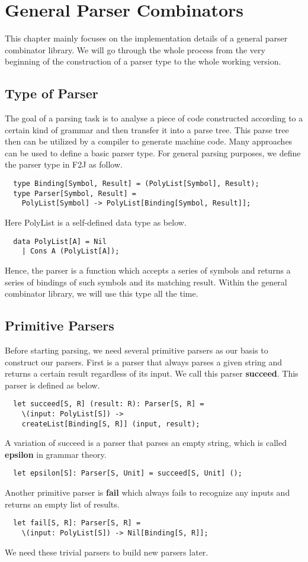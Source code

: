 \chapter{General Parser Combinators}
This chapter mainly focuses on the implementation details of a general parser combinator library. We will go through the whole process from the very beginning of the construction of a parser type to the whole working version.

\section{Type of Parser}
The goal of a parsing task is to analyse a piece of code constructed according to a certain kind of grammar and then transfer it into a parse tree. This parse tree then can be utilized by a compiler to generate machine code. Many approaches can be used to define a basic parser type. For general parsing purposes, we define the parser type in F2J as follow.
\begin{lstlisting}
  type Binding[Symbol, Result] = (PolyList[Symbol], Result);
  type Parser[Symbol, Result] = 
	PolyList[Symbol] -> PolyList[Binding[Symbol, Result]];
\end{lstlisting}
Here PolyList is a self-defined data type as below.
\begin{lstlisting}
  data PolyList[A] = Nil
	| Cons A (PolyList[A]);
\end{lstlisting}
Hence, the parser is a function which accepts a series of symbols and returns a series of bindings of such symbols and its matching result. Within the general combinator library, we will use this type all the time.

\section{Primitive Parsers}
Before starting parsing, we need several primitive parsers as our basis to construct our parsers. First is a parser that always parses a given string and returns a certain result regardless of its input. We call this parser \textbf{succeed}. This parser is defined as below.
\begin{lstlisting}
  let succeed[S, R] (result: R): Parser[S, R] =
	\(input: PolyList[S]) -> 
	createList[Binding[S, R]] (input, result);
\end{lstlisting}
A variation of succeed is a parser that parses an empty string, which is called \textbf{epsilon} in grammar theory.
\begin{lstlisting}
  let epsilon[S]: Parser[S, Unit] = succeed[S, Unit] ();
\end{lstlisting}
Another primitive parser is \textbf{fail} which always fails to recognize any inputs and returns an empty list of results.
\begin{lstlisting}
  let fail[S, R]: Parser[S, R] =
	\(input: PolyList[S]) -> Nil[Binding[S, R]];
\end{lstlisting}
We need these trivial parsers to build new parsers later.


